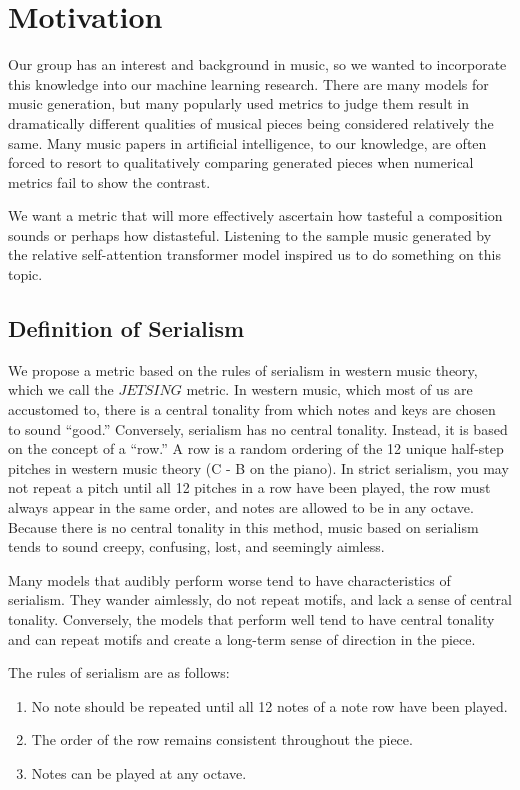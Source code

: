 \documentclass[11pt]{article}
\begin{document}
\section{Motivation}
Our group has an interest and background in music, so we wanted to incorporate this knowledge into our machine learning research.
There are many models for music generation, but many popularly used metrics to judge them result in dramatically different qualities of musical pieces being considered relatively the same.
Many music papers in artificial intelligence, to our knowledge, are often forced to resort to qualitatively comparing generated pieces when numerical metrics fail to show the contrast.

We want a metric that will more effectively ascertain how tasteful a composition sounds or perhaps how distasteful.
Listening to the sample music generated by the relative self-attention transformer model inspired us to do something on this topic.

\subsection{Definition of Serialism}

We propose a metric based on the rules of serialism in western music theory, which we call the $JETSING$ metric.
In western music, which most of us are accustomed to, there is a central tonality from which notes and keys are chosen to sound “good.”
Conversely, serialism has no central tonality. Instead, it is based on the concept of a “row.”
A row is a random ordering of the 12 unique half-step pitches in western music theory (C - B on the piano).
In strict serialism, you may not repeat a pitch until all 12 pitches in a row have been played, the row must always appear in the same order, and notes are allowed to be in any octave.
Because there is no central tonality in this method, music based on serialism tends to sound creepy, confusing, lost, and seemingly aimless.

Many models that audibly perform worse tend to have characteristics of serialism.
They wander aimlessly, do not repeat motifs, and lack a sense of central tonality.
Conversely, the models that perform well tend to have central tonality and can repeat motifs and create a long-term sense of direction in the piece.

The rules of serialism are as follows:
\begin{enumerate}
    \item No note should be repeated until all 12 notes of a note row have been played.
    \item The order of the row remains consistent throughout the piece.
    \item Notes can be played at any octave.
\end{enumerate}
\end{document}
